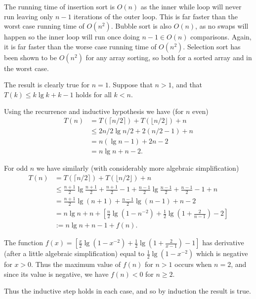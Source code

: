 The running time of insertion sort is \(O(n)\) as the inner while loop will never run leaving only \(n-1\) iterations of the outer loop.
This is far faster than the worst case running time of \(O(n^2)\).
Bubble sort is also \(O(n)\), as no swaps will happen so the inner loop will run once doing \(n-1 \in O(n)\) comparisons. Again, it is far faster than the worse case running time of \(O(n^2)\). 
Selection sort has been shown to be \(O(n^2)\) for any array sorting, so both for a sorted array and in the worst case.
\fi

The result is clearly true for $n=1$. Suppose that $n > 1$, and that
 $T(k) \leq k\lg k + k - 1$ holds for all $k < n$.

Using the recurrence and inductive hypothesis we have (for $n$ even)
\begin{align*}
T(n)  &= T(\lceil n/2\rceil) + T(\lfloor n/2 \rfloor) + n \\
& \leq 2 n/2 \lg n/2 + 2 (n/2 - 1) + n \\
& = n (\lg n - 1) + 2n - 2 \\
& = n \lg n + n - 2. 
\end{align*}

For odd $n$ we have similarly (with considerably more algebraic simplification)
\begin{align*}
T(n)  &= T(\lceil n/2\rceil) + T(\lfloor n/2 \rfloor) + n \\
& \leq \frac{n+1}{2} \lg \frac{n+1}{2} + \frac{n+1}{2} - 1 + \frac{n-1}{2} \lg \frac{n-1}{2} + 
\frac{n-1}{2} - 1 + n \\
& = \frac{n+1}{2} \lg (n+1) + \frac{n-1}{2} \lg (n-1) + n - 2 \\
& = n \lg n + n + \left[\frac{n}{2} \lg (1 - n^{-2}) + \frac{1}{2} \lg (1 + \frac{2}{n-1}) - 2\right]
\\
& :=  n \lg n + n - 1 + f(n). 
\end{align*}

The function $f(x) = \left[\frac{x}{2} \lg (1 - x^{-2}) + \frac{1}{2} \lg (1 + \frac{2}{x-1}) - 1\right]$ has derivative (after a little algebraic simplification) equal to 
$\frac{1}{2} \lg (1 - x^{-2})$ which is negative for $x>0$. Thus the maximum value of $f(n)$ 
for $n>1$ occurs when $n=2$, and since its value is negative, we have $f(n) <0$ for 
$n\geq 2$.

Thus the inductive step holds in each case, and so by induction the result is true.
\fi

